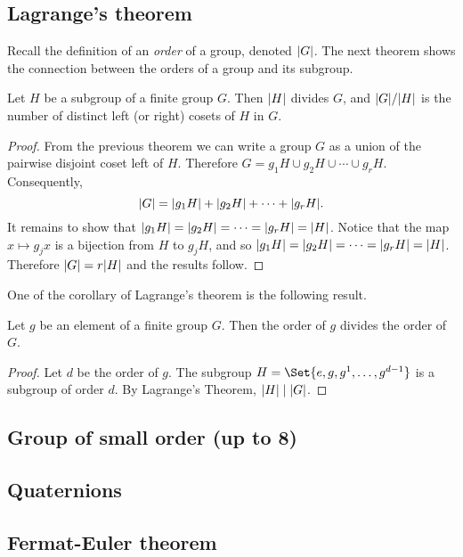 \documentclass[main.tex]{subfiles}
\begin{document}
			\subsection{Lagrange’s theorem}
			Recall the definition of an \textit{order} of a group, denoted $\lvert G\rvert$. The next theorem shows the connection between the orders of a group and its subgroup.
				\begin{theorem}
					Let $H$ be a subgroup of a finite group $G$. Then $\lvert H\rvert$ divides $G$, and $\lvert G\rvert/\lvert H\rvert$ is the number of distinct left (or right) cosets of $H$ in $G$.
				\end{theorem}
				\begin{proof}
					From the previous theorem we can write a group $G$ as a union of the pairwise disjoint coset left of $H$. Therefore $G = g_1H \cup g_2 H \cup \cdots \cup g_r H$. Consequently,
					\begin{equation*}
						\lvert G\rvert = \lvert g_1 H\rvert + \lvert g_2 H\rvert + \cdots + \lvert g_r H\rvert.
					\end{equation*}
					It remains to show that $\lvert g_1 H\rvert = \lvert g_2 H\rvert = \cdots = \lvert g_r H\rvert = \lvert H\rvert$. Notice that the map $x \mapsto g_j x$ is a bijection from $H$ to $g_j H$, and so $\lvert g_1 H\rvert = \lvert g_2 H\rvert = \cdots = \lvert g_r H\rvert = \lvert H\rvert$. Therefore $\lvert G\rvert = r\lvert H\rvert$ and the results follow.
				\end{proof}
			
			One of the corollary of Lagrange's theorem is the following result.
			\begin{corollary}
					Let $g$ be an element of a finite group $G$. Then the order of $g$ divides the order of $G$.
			\end{corollary}
			\begin{proof}
				Let $d$ be the order of $g$. The subgroup $H = \Set{e, g, g^1, \ldots, g^{d-1}}$ is a subgroup of order $d$. By Lagrange's Theorem, $\lvert H\rvert \mid \lvert G\rvert$.
			\end{proof}
			\subsection{Group of small order (up to 8)}
			
			\subsection{Quaternions}
			
			\subsection{Fermat-Euler theorem}
			
\end{document}
